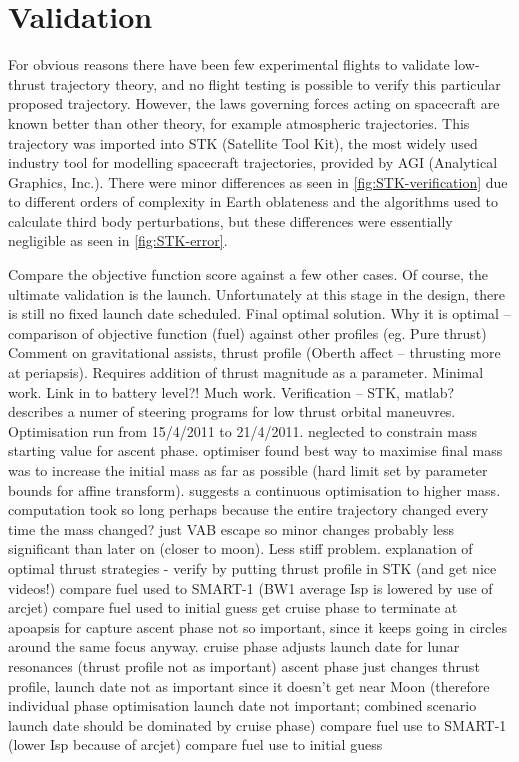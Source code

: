 
\section{Validation}
For obvious reasons there have been few experimental flights to validate low-thrust trajectory theory, and no flight testing is possible to verify this particular proposed trajectory. However, the laws governing forces acting on spacecraft are known better than other theory, for example atmospheric trajectories. This trajectory was imported into STK (Satellite Tool Kit), the most widely used industry tool for modelling spacecraft trajectories, provided by AGI (Analytical Graphics, Inc.). There were minor differences as seen in \ref{fig:STK-verification} due to different orders of complexity in Earth oblateness and the algorithms used to calculate third body perturbations, but these differences were essentially negligible as seen in \ref{fig:STK-error}.

Compare the objective function score against a few other cases.
Of course, the ultimate validation is the launch. Unfortunately at this stage in the design, there is still no fixed launch date scheduled.
Final optimal solution.
Why it is optimal – comparison of objective function (fuel) against other profiles (eg. Pure thrust)
Comment on gravitational assists, thrust profile (Oberth affect – thrusting more at periapsis).
Requires addition of thrust magnitude as a parameter. Minimal work.
Link in to battery level?! Much work.
Verification – STK, matlab?
\textcite{Pollard2000} describes a numer of steering programs for low thrust orbital maneuvres.
Optimisation run from 15/4/2011 to 21/4/2011. neglected to constrain mass starting value for ascent phase. optimiser found best way to maximise final mass was to increase the initial mass as far as possible (hard limit set by parameter bounds for affine transform). suggests a continuous optimisation to higher mass. computation took so long perhaps because the entire trajectory changed every time the mass changed? just VAB escape so minor changes probably less significant than later on (closer to moon). Less stiff problem.
explanation of optimal thrust strategies - \textcite{Herbiniere2000}
verify by putting thrust profile in STK (and get nice videos!)
compare fuel used to SMART-1 (BW1 average Isp is lowered by use of arcjet)
compare fuel used to initial guess
get cruise phase to terminate at apoapsis for capture
ascent phase not so important, since it keeps going in circles around the same focus anyway.
cruise phase adjusts launch date for lunar resonances (thrust profile not as important)
ascent phase just changes thrust profile, launch date not as important since it doesn't get near Moon (therefore individual phase optimisation launch date not important; combined scenario launch date should be dominated by cruise phase)
compare fuel use to SMART-1 (lower Isp because of arcjet)
compare fuel use to initial guess


